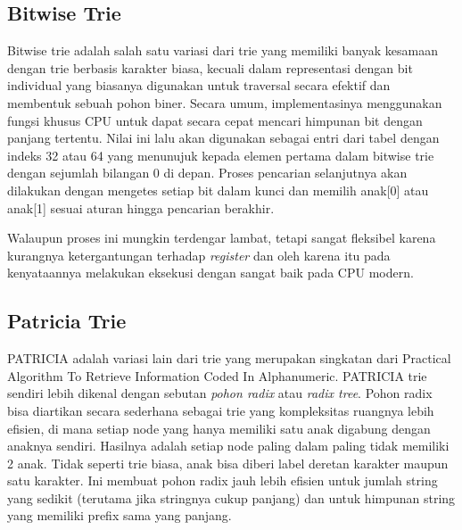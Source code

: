\subsection{Bitwise Trie}
\label{sec:bitwiseTrie}

Bitwise trie adalah salah satu variasi dari trie yang memiliki banyak kesamaan dengan trie berbasis karakter biasa, kecuali dalam representasi dengan bit individual yang biasanya digunakan untuk traversal secara efektif dan membentuk sebuah pohon biner. Secara umum, implementasinya menggunakan fungsi khusus CPU untuk dapat secara cepat mencari himpunan bit dengan panjang tertentu. Nilai ini lalu akan digunakan sebagai entri dari tabel dengan indeks 32 atau 64 yang menunujuk kepada elemen pertama dalam bitwise trie dengan sejumlah bilangan 0 di depan. Proses pencarian selanjutnya akan dilakukan dengan mengetes setiap bit dalam kunci dan memilih anak[0] atau anak[1] sesuai aturan hingga pencarian berakhir.

Walaupun proses ini mungkin terdengar lambat, tetapi sangat fleksibel karena kurangnya ketergantungan terhadap \textit{register} dan oleh karena itu pada kenyataannya melakukan eksekusi dengan sangat baik pada CPU modern.

\subsection{Patricia Trie}
\label{sec:patriciaTrie}

PATRICIA adalah variasi lain dari trie yang merupakan singkatan dari Practical Algorithm To Retrieve Information Coded In Alphanumeric. PATRICIA trie sendiri lebih dikenal dengan sebutan \textit{pohon radix} atau \textit{radix tree}. Pohon radix bisa diartikan secara sederhana sebagai trie yang kompleksitas ruangnya lebih efisien, di mana setiap node yang hanya memiliki satu anak digabung dengan anaknya sendiri. Hasilnya adalah setiap node paling dalam paling tidak memiliki 2 anak. Tidak seperti trie biasa, anak bisa diberi label deretan karakter maupun satu karakter. Ini membuat pohon radix jauh lebih efisien untuk jumlah string yang sedikit (terutama jika stringnya cukup panjang) dan untuk himpunan string yang memiliki prefix sama yang panjang.


